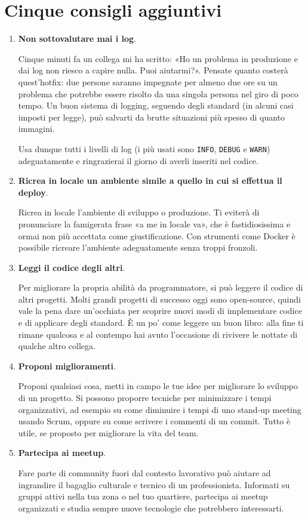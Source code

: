 \section{Cinque consigli aggiuntivi}

\begin{enumerate}

\item \textbf{Non sottovalutare mai i log}.

Cinque minuti fa un collega mi ha scritto: «Ho un problema in produzione e dai log non riesco a capire nulla. Puoi aiutarmi?». Pensate quanto costerà quest’hotfix: due persone saranno impegnate per almeno due ore su un problema che potrebbe essere risolto da una singola persona nel giro di poco tempo. Un buon sistema di logging, seguendo degli standard (in alcuni casi imposti per legge), può salvarti da brutte situazioni più spesso di quanto immagini. 

Usa dunque tutti i livelli di log (i più usati sono \texttt{INFO}, \texttt{DEBUG} e \texttt{WARN}) adeguatamente e ringrazierai il giorno di averli inseriti nel codice.

\item \textbf{Ricrea in locale un ambiente simile a quello in cui si effettua il deploy}.

Ricrea in locale l’ambiente di sviluppo o produzione. Ti eviterà di pronunciare la famigerata frase «a me in locale va», che è fastidiosissima e ormai non più accettata come giustificazione. Con strumenti come Docker è possibile ricreare l’ambiente adeguatamente senza troppi fronzoli.

\item \textbf{Leggi il codice degli altri}.

Per migliorare la propria abilità da programmatore, si può leggere il codice di altri progetti. Molti grandi progetti di successo oggi sono open-source, quindi vale la pena dare un’occhiata per scoprire nuovi modi di implementare codice e di applicare degli standard. È un po’ come leggere un buon libro: alla fine ti rimane qualcosa e al contempo hai avuto l’occasione di rivivere le nottate di qualche altro collega.


\item \textbf{Proponi miglioramenti}.

Proponi qualsiasi cosa, metti in campo le tue idee per migliorare lo sviluppo di un progetto. Si possono proporre tecniche per minimizzare i tempi organizzativi, ad esempio su come diminuire i tempi di uno stand-up meeting usando Scrum, oppure su come scrivere i commenti di un commit. Tutto è utile, se proposto per migliorare la vita del team.

\item \textbf{Partecipa ai meetup}.

Fare parte di community fuori dal contesto lavorativo può aiutare ad ingrandire il bagaglio culturale e tecnico di un professionista. Informati su gruppi attivi nella tua zona o nel tuo quartiere, partecipa ai meetup organizzati e studia sempre nuove tecnologie che potrebbero interessarti.


\end{enumerate}